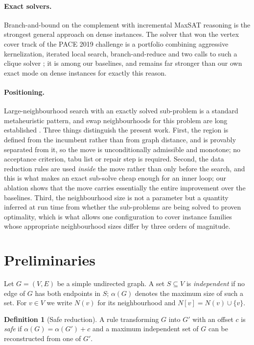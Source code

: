 \documentclass[preprint,12pt]{elsarticle}
\theoremstyle{definition}
\newtheorem{definition}[theorem]{Definition}
\begin{document}
\paragraph{Exact solvers.} Branch-and-bound on the complement with incremental
MaxSAT reasoning \cite{li2017momc} is the strongest general approach on dense
instances. The solver that won the vertex cover track of the PACE 2019
challenge \cite{pace2019} is a portfolio combining aggressive kernelization,
iterated local search, branch-and-reduce and two calls to such a clique solver
\cite{hespe2020}; it is among our baselines, and remains far stronger than our
own exact mode on dense instances for exactly this reason.

\paragraph{Positioning.} Large-neighbourhood search with an exactly solved
sub-problem is a standard metaheuristic pattern, and swap neighbourhoods for
this problem are long established \cite{andrade2012}. Three things distinguish
the present work. First, the region is defined from the incumbent rather than
from graph distance, and is provably separated from it, so the move is
unconditionally admissible and monotone; no acceptance criterion, tabu list or
repair step is required. Second, the data reduction rules are used \emph{inside}
the move rather than only before the search, and this is what makes an exact
sub-solve cheap enough for an inner loop; our ablation shows that the move
carries essentially the entire improvement over the baselines. Third, the
neighbourhood size is not a parameter but a quantity inferred at run time from
whether the sub-problems are being solved to proven optimality, which is what
allows one configuration to cover instance families whose appropriate
neighbourhood sizes differ by three orders of magnitude.

\section{Preliminaries}
Let $G=(V,E)$ be a simple undirected graph. A set $S \subseteq V$ is
\emph{independent} if no edge of $G$ has both endpoints in $S$; $\alpha(G)$
denotes the maximum size of such a set. For $v \in V$ we write $N(v)$ for its
neighbourhood and $N[v] = N(v) \cup \{v\}$.

\begin{definition}[Safe reduction]
A rule transforming $G$ into $G'$ with an offset $c$ is \emph{safe} if
$\alpha(G) = \alpha(G') + c$ and a maximum independent set of $G$ can be
reconstructed from one of $G'$.
\end{definition}
\end{document}
